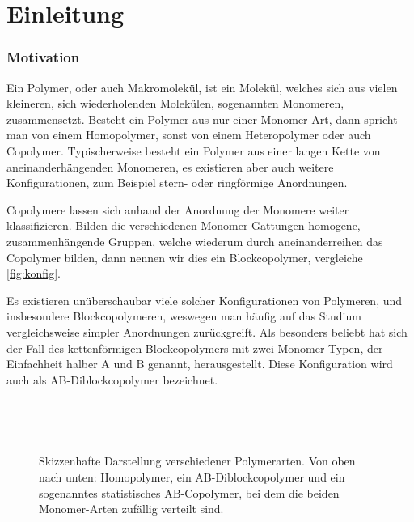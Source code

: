 
\chapter{Einleitung} %
\label{cha:einleitung}

\subsection*{Motivation} %
\label{sec:motivation}

Ein Polymer, oder auch Makromolekül, ist ein Molekül, welches sich aus vielen kleineren, sich wiederholenden Molekülen, sogenannten Monomeren, zusammensetzt.
Besteht ein Polymer aus nur einer Monomer-Art, dann spricht man von einem Homopolymer, sonst von einem Heteropolymer oder auch Copolymer.
Typischerweise besteht ein Polymer aus einer langen Kette von aneinanderhängenden Monomeren, es existieren aber auch weitere Konfigurationen, zum Beispiel stern- oder ringförmige Anordnungen.

Copolymere lassen sich anhand der Anordnung der Monomere weiter klassifizieren.
Bilden die verschiedenen Monomer-Gattungen homogene, zusammenhängende Gruppen, welche wiederum durch aneinanderreihen das Copolymer bilden, dann nennen wir dies ein Blockcopolymer, vergleiche \autoref{fig:konfig}.

Es existieren unüberschaubar viele solcher Konfigurationen von Polymeren, und insbesondere Blockcopolymeren, weswegen man häufig auf das Studium vergleichsweise simpler Anordnungen zurückgreift.
Als besonders beliebt hat sich der Fall des kettenförmigen Blockcopolymers mit zwei Monomer-Typen, der Einfachheit halber A und B genannt, herausgestellt.
Diese Konfiguration wird auch als AB-Diblockcopolymer bezeichnet.

\begin{figure}[tb]
    \centering
    \begin{subfigure}[b]{\textwidth}
        \centering
        
    \end{subfigure}
    \\[1em]
    \begin{subfigure}[b]{\textwidth}
        \centering
        
    \end{subfigure}
    \\[1em]
    \begin{subfigure}[b]{\textwidth}
        \centering
        
    \end{subfigure}
    \caption[Skizzenhafte Darstellung verschiedener Polymerarten]{%
        Skizzenhafte Darstellung verschiedener Polymerarten.
        Von oben nach unten: Homopolymer, ein AB-Diblockcopolymer und ein sogenanntes statistisches AB-Copolymer, bei dem die beiden Monomer-Arten zufällig verteilt sind.
    }
    \label{fig:konfig}
\end{figure}


